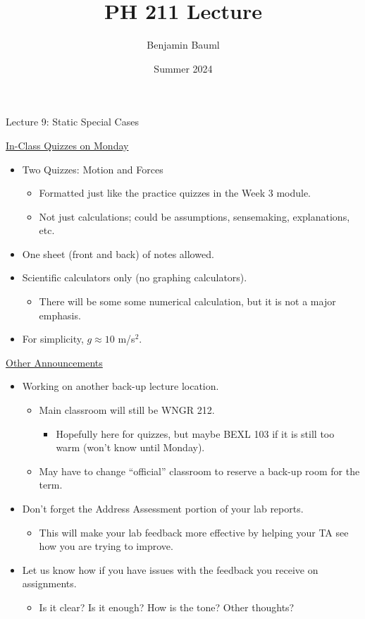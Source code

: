 \documentclass[]{article}
\title{PH 211 Lecture \Week}
\author{Benjamin Bauml}
\date{Summer 2024}
\begin{document}
\begin{TeacherMargin}

\end{TeacherMargin}
\begin{PresentSpace}
\begin{center}
	\huge Lecture 9: Static Special Cases
\end{center}
\vspace{0.5cm}
\underline{In-Class Quizzes on Monday}
\begin{itemize}
	\item Two Quizzes: Motion and Forces
	\begin{itemize}
		\large
		\item Formatted just like the practice quizzes in the Week 3 module.
		\item Not just calculations; could be assumptions, sensemaking, explanations, etc.
	\end{itemize}
	\item One sheet (front and back) of notes allowed.
	\item Scientific calculators only (no graphing calculators).
	\begin{itemize}
		\large
		\item There will be some some numerical calculation, but it is not a major emphasis.
	\end{itemize}
	\item For simplicity, $g\approx 10$ m/s$^{2}$.
\end{itemize}
\vspace{0.5cm}
\underline{Other Announcements}
\begin{itemize}
	\item Working on another back-up lecture location.
	\begin{itemize}
		\large
		\item Main classroom will still be WNGR 212.
		\begin{itemize}
			\item Hopefully here for quizzes, but maybe BEXL 103 if it is still too warm (won't know until Monday).
		\end{itemize}
		\item May have to change ``official'' classroom to reserve a back-up room for the term.
	\end{itemize}
	\item Don't forget the Address Assessment portion of your lab reports.
	\begin{itemize}
		\item This will make your lab feedback more effective by helping your TA see how you are trying to improve.
	\end{itemize}
	\item Let us know how if you have issues with the feedback you receive on assignments.
	\begin{itemize}
		\large
		\item Is it clear? Is it enough? How is the tone? Other thoughts?
	\end{itemize}
\end{itemize}
\end{PresentSpace}
\end{document}

